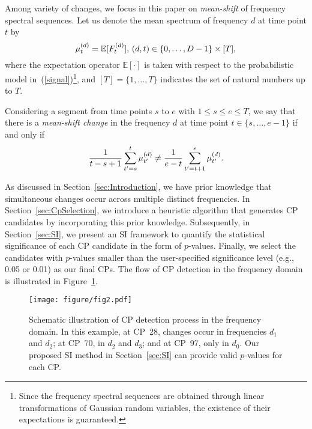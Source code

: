 Among variety of changes, we focus in this paper on \emph{mean-shift} of frequency spectral sequences.
%
Let us denote the mean spectrum of frequency $d$ at time point $t$ by 
\begin{equation}
 \mu_t^{(d)} = \mathbb{E}[F_t^{(d)}], \, (d, t) \in \{0, \ldots, D-1\} \times [T], \notag
\end{equation}
where the expectation operator $\mathbb{E}[\cdot]$ is taken with respect to the probabilistic model in~(\ref{signal})\footnote{
  Since the frequency spectral sequences are obtained through linear transformations of Gaussian random variables, 
  the existence of their expectations is guaranteed.  
}, and $[T] = {\{1, \dots, T \}}$ indicates the set of natural numbers up to $T$.

%
Considering a segment from time points $s$ to $e$ with $1 \le s \le e \le T$, we say that there is a \emph{mean-shift change} in the frequency $d$ at time point $t \in \{s, \ldots, e-1\}$ if and only if
\begin{equation}
 \frac{1}{t - s + 1} \sum_{t^\prime = s}^{t} \mu_{t^\prime}^{(d)}
 \neq
 \frac{1}{e - t} \sum_{t^\prime = t+1}^{e} \mu_{t^\prime}^{(d)}. \notag
\end{equation}


As discussed in Section~\ref{sec:Introduction}, we have prior knowledge that simultaneous changes occur across multiple distinct frequencies.
%
In Section~\ref{sec:CpSelection}, we introduce a heuristic algorithm that generates CP candidates by incorporating this prior knowledge.
%
Subsequently, in Section~\ref{sec:SI}, we present an SI framework to quantify the statistical significance of each CP candidate in the form of $p$-values.
%
Finally, we select the candidates with $p$-values smaller than the user-specified significance level (e.g., 0.05 or 0.01) as our final CPs.
%
The flow of CP detection in the frequency domain is illustrated in Figure~\ref{fig:fig2}.
%
\begin{figure}[H]
\centering
\texttt{[image: figure/fig2.pdf]}
 \caption{
 Schematic illustration of CP detection process in the frequency domain.
 In this example, at CP~28, changes occur in frequencies $d_1$ and $d_2$; at CP~70, in $d_2$ and $d_3$; and at CP~97, only in $d_0$.
 Our proposed SI method in Section~\ref{sec:SI} can provide valid $p$-values for each CP.
 }
\label{fig:fig2}
\end{figure}
